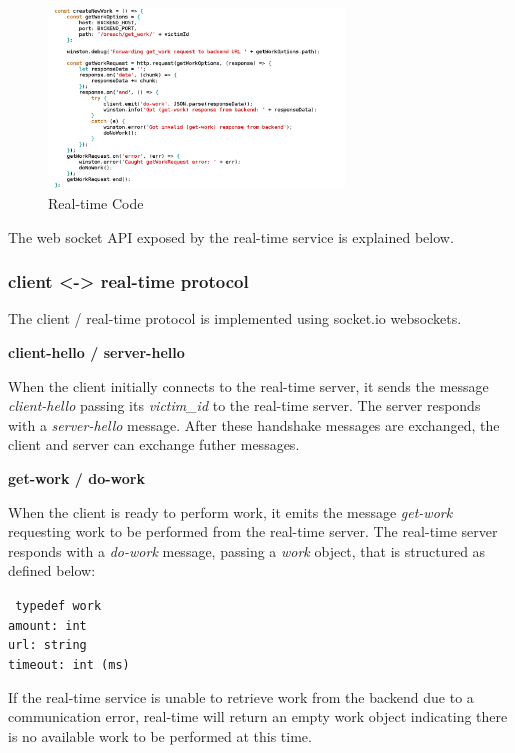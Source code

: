 \begin{figure}[H] \caption{Real-time Code} \centering
\includegraphics[width=0.7\textwidth]{diagrams/realtime.png}\end{figure}

The web socket API exposed by the real-time service is explained below.

\subsubsection{client <-> real-time protocol}

The client / real-time protocol is implemented using socket.io websockets.

 \textbf{client-hello / server-hello}

When the client initially connects to the real-time server, it sends the message
\textit{client-hello} passing its \textit{victim\_id} to the real-time server.  The server
responds with a \textit{server-hello} message. After these handshake messages are
exchanged, the client and server can exchange futher messages.

 \textbf{get-work / do-work}

When the client is ready to perform work, it emits the message \textit{get-work}
requesting work to be performed from the real-time server. The real-time server
responds with a \textit{do-work} message, passing a \textit{work} object, that is
structured as defined below:

\texttt{
typedef work \\
  amount: int \\
  url: string \\
  timeout: int (ms) \\
}

If the real-time service is unable to retrieve work from the backend due to a
communication error, real-time will return an empty work object indicating
there is no available work to be performed at this time.

